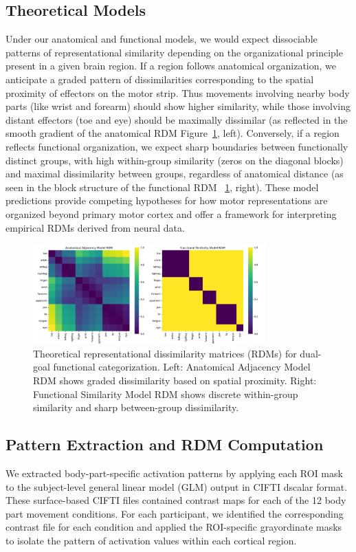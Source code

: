 \documentclass{article}
\begin{document}
\subsection{Theoretical Models}
Under our anatomical and functional models, we would expect dissociable patterns of representational similarity depending on the organizational principle present in a given brain region. If a region follows anatomical organization, we anticipate a graded pattern of dissimilarities corresponding to the spatial proximity of effectors on the motor strip. Thus movements involving nearby body parts (like wrist and forearm) should show higher similarity, while those involving distant effectors (toe and eye) should be maximally dissimilar (as reflected in the smooth gradient of the anatomical RDM Figure~\ref{fig:theoretical_rdms}, left). Conversely, if a region reflects functional organization, we expect sharp boundaries between functionally distinct groups, with high within-group similarity (zeros on the diagonal blocks) and maximal dissimilarity between groups, regardless of anatomical distance (as seen in the block structure of the functional RDM ~\ref{fig:theoretical_rdms}, right). These model predictions provide competing hypotheses for how motor representations are organized beyond primary motor cortex and offer a framework for interpreting empirical RDMs derived from neural data. 
\begin{figure}[!htbp]
\centering
\includegraphics[width=0.8\textwidth]{results/goal_dual/theoretical_rdms.png}
\caption{Theoretical representational dissimilarity matrices (RDMs) for dual-goal functional categorization. Left: Anatomical Adjacency Model RDM shows graded dissimilarity based on spatial proximity. Right: Functional Similarity Model RDM shows discrete within-group similarity and sharp between-group dissimilarity.}
\label{fig:theoretical_rdms}
\end{figure}

\subsection{Pattern Extraction and RDM Computation}
We extracted body-part-specific activation patterns by applying each ROI mask to the subject-level general linear model (GLM) output in CIFTI dscalar format. These surface-based CIFTI files contained contrast maps for each of the 12 body part movement conditions. For each participant, we identified the corresponding contrast file for each condition and applied the ROI-specific grayordinate masks to isolate the pattern of activation values within each cortical region.
\end{document}
